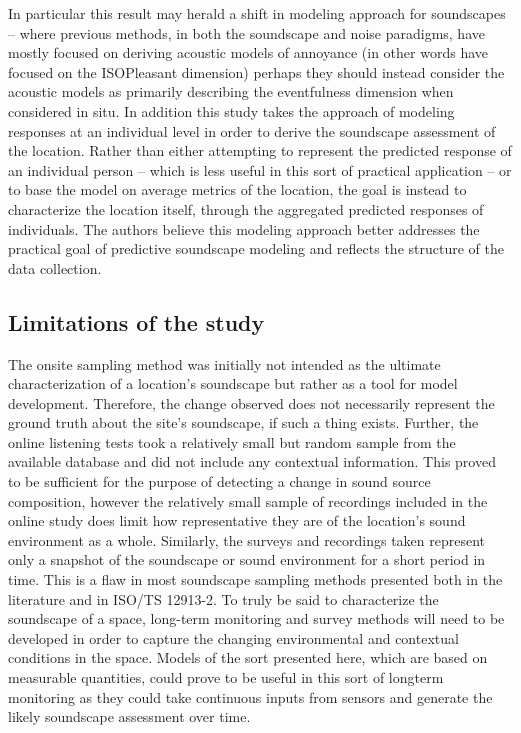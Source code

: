 \documentclass[
  authoryear,
  preprint,
  3p,
  onecolumn]{elsarticle}
\begin{document}
In particular this result may herald a shift in modeling approach for
soundscapes -- where previous methods, in both the soundscape and noise
paradigms, have mostly focused on deriving acoustic models of annoyance
(in other words have focused on the ISOPleasant dimension) perhaps they
should instead consider the acoustic models as primarily describing the
eventfulness dimension when considered in situ. In addition this study
takes the approach of modeling responses at an individual level in order
to derive the soundscape assessment of the location. Rather than either
attempting to represent the predicted response of an individual person
-- which is less useful in this sort of practical application -- or to
base the model on average metrics of the location, the goal is instead
to characterize the location itself, through the aggregated predicted
responses of individuals. The authors believe this modeling approach
better addresses the practical goal of predictive soundscape modeling
and reflects the structure of the data collection.

\subsection{Limitations of the study}\label{limitations-of-the-study}

The onsite sampling method was initially not intended as the ultimate
characterization of a location's soundscape but rather as a tool for
model development. Therefore, the change observed does not necessarily
represent the ground truth about the site's soundscape, if such a thing
exists. Further, the online listening tests took a relatively small but
random sample from the available database and did not include any
contextual information. This proved to be sufficient for the purpose of
detecting a change in sound source composition, however the relatively
small sample of recordings included in the online study does limit how
representative they are of the location's sound environment as a whole.
Similarly, the surveys and recordings taken represent only a snapshot of
the soundscape or sound environment for a short period in time. This is
a flaw in most soundscape sampling methods presented both in the
literature and in ISO/TS 12913-2. To truly be said to characterize the
soundscape of a space, long-term monitoring and survey methods will need
to be developed in order to capture the changing environmental and
contextual conditions in the space. Models of the sort presented here,
which are based on measurable quantities, could prove to be useful in
this sort of longterm monitoring as they could take continuous inputs
from sensors and generate the likely soundscape assessment over time.
\end{document}
